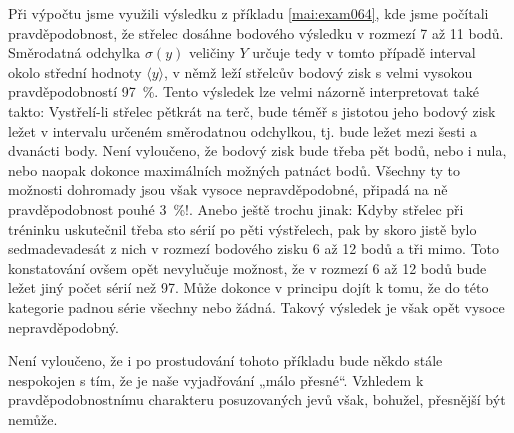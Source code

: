 \begin{example}
  Při výpočtu jsme využili výsledku z příkladu \ref{mai:exam064}, kde jsme počítali 
  pravděpodobnost, že střelec dosáhne bodového výsledku v rozmezí \num{7} až \num{11} bodů. 
  Směrodatná odchylka \(\sigma(y)\) veličiny \(Y\) určuje tedy v tomto případě interval okolo 
  střední hodnoty \(\langle y \rangle\), v němž leží střelcův bodový zisk s velmi vysokou 
  pravděpodobností \SI{97}{\percent}. Tento výsledek lze velmi názorně interpretovat také takto: 
  Vystřelí-li střelec pětkrát na terč, bude téměř s jistotou jeho bodový zisk ležet v intervalu 
  určeném směrodatnou odchylkou, tj. bude ležet mezi šesti a dvanácti body. Není vyloučeno, že 
  bodový zisk bude třeba pět bodů, nebo i nula, nebo naopak dokonce maximálních možných patnáct 
  bodů. Všechny ty to možnosti dohromady jsou však vysoce nepravděpodobné, připadá na ně
  pravděpodobnost pouhé \SI{3}{\percent}!. Anebo ještě trochu jinak: Kdyby střelec při tréninku 
  uskutečnil třeba sto sérií po pěti výstřelech, pak by skoro jistě bylo sedmadevadesát z nich v 
  rozmezí bodového zisku \num{6} až \num{12} bodů a tři mimo. Toto konstatování ovšem opět 
  nevylučuje možnost, že v rozmezí \num{6} až \num{12} bodů bude ležet jiný počet sérií
  než \num{97}. Může dokonce v principu dojít k tomu, že do této kategorie padnou série všechny 
  nebo žádná. Takový výsledek je však opět vysoce nepravděpodobný.
  
  Není vyloučeno, že i po prostudování tohoto příkladu bude někdo stále nespokojen s tím, že je 
  naše vyjadřování „málo přesné“. Vzhledem k pravděpodobnostnímu charakteru posuzovaných jevů však, 
  bohužel, přesnější být nemůže.
\normalsize
\end{example}